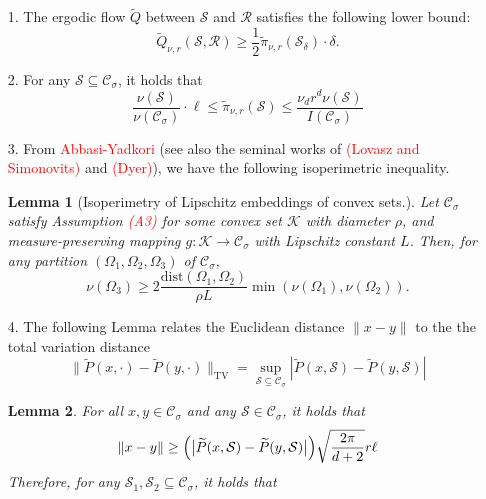 \documentclass{report}
\newcommand{\1}{\mathbf{1}}
\newcommand{\mc}[1]{\mathcal{#1}}
\newcommand{\wt}[1]{\widetilde{#1}}
\newcommand{\dist}{\mathrm{dist}}
\theoremstyle{alden}
\theoremstyle{aldenthm}
\newtheorem{lemma}{Lemma}
\theoremstyle{definition}
\theoremstyle{remark}
\begin{document}
\begin{enumerate}
	\item[1.] The ergodic flow $\wt{Q}$ between $\mc{S}$ and $\mc{R}$ satisfies the following lower bound:
	\begin{equation*}
	\wt{Q}_{\nu,r}(\mc{S},\mc{R}) \geq \frac{1}{2} \wt{\pi}_{\nu,r}(\mc{S}_{\delta}) \cdot \delta.
	\end{equation*}
	\item[2.] For any $\mc{S} \subseteq \mc{C}_{\sigma}$, it holds that
	\begin{equation*}
	\frac{\nu(\mc{S})}{\nu(\mc{C}_{\sigma})} \cdot \ell \leq \wt{\pi}_{\nu,r}(\mc{S}) \leq \frac{\nu_d r^d \nu(\mc{S})}{I(\mc{C}_{\sigma})}
	\end{equation*}
	\item[3.] From \textcolor{red}{Abbasi-Yadkori} (see also the seminal works of \textcolor{red}{(Lovasz and Simonovits)} and \textcolor{red}{(Dyer)}), we have the following isoperimetric inequality.
	\begin{lemma}[Isoperimetry of Lipschitz embeddings of convex sets.]
		\label{lem: nonconvex_isoperimetry}
		Let $\mc{C}_{\sigma}$ satisfy Assumption \textcolor{red}{(A3)} for some convex set $\mathcal{K}$ with diameter $\rho$, and measure-preserving mapping $g: \mathcal{K} \to \mc{C}_{\sigma}$ with Lipschitz constant $L$. Then, for any partition $(\Omega_1,\Omega_2,\Omega_3)$ of $\mc{C}_{\sigma}$, 
		\begin{equation*}
		\nu(\Omega_3) \geq 2\frac{\dist(\Omega_1, \Omega_2)}{\rho L} \min(\nu(\Omega_1), \nu(\Omega_2)).
		\end{equation*}
	\end{lemma}
	\item[4.] 
	The following Lemma relates the Euclidean distance $\|x - y\|$ to the the total variation distance
	\begin{equation*}
	\|\wt{P}(x,\cdot) - \wt{P}(y,\cdot)\|_{\mathrm{TV}} = \sup_{\mc{S} \subseteq \mc{C}_{\sigma}} |\wt{P}(x,\mc{S}) - \wt{P}(y,\mc{S}) |
	\end{equation*}
	\begin{lemma}
		\label{lem: one_step_distributions}
		For all $x,y \in \mc{C}_{\sigma}$ and any $\mc{S} \in \mc{C}_{\sigma}$, it holds that
		\begin{equation}
		\label{eqn:one_step_distributions_1}
		\|x - y\| \geq \Bigl(\bigl|\wt{P}(x,\mc{S}) - \wt{P}(y,\mc{S})\bigr|\Bigr)\sqrt{\frac{2\pi}{d + 2}}r\ell
		\end{equation}
		Therefore, for any $\mc{S}_1,\mc{S}_2 \subseteq \mc{C}_{\sigma}$, it holds that

\end{lemma}
\end{enumerate}
\end{document}
